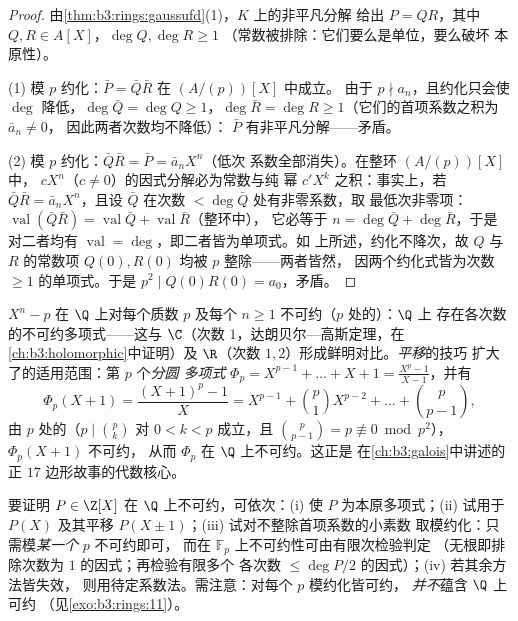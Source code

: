 \begin{proof}
由\cref{thm:b3:rings:gaussufd}(1)，$K$ 上的非平凡分解
给出 $P = QR$，其中 $Q, R \in A[X]$，$\deg Q, \deg R \geq 1$
（常数被排除：它们要么是单位，要么破坏
本原性）。

(1) 模 $p$ 约化：$\bar P = \bar Q\bar R$ 在 $(A/(p))[X]$ 中成立。
由于 $p \nmid a_n$，且约化只会使 $\deg$ 降低，$\deg \bar
Q = \deg Q \geq 1$，$\deg\bar R = \deg R \geq 1$（它们的首项系数之积为 $\bar a_n \neq 0$，
因此两者次数均不降低）：
$\bar P$ 有非平凡分解——矛盾。

(2) 模 $p$ 约化：$\bar Q \bar R = \bar P = \bar a_n X^n$（低次
系数全部消失）。在整环 $(A/(p))[X]$ 中，
$cX^n$（$c \ne 0$）的因式分解必为常数与纯
幂 $c'X^k$ 之积：事实上，若 $\bar Q\bar R = \bar a_nX^n$，且设
$\bar Q$ 在次数 $< \deg\bar Q$ 处有非零系数，取
最低次非零项：$\operatorname{val}(\bar Q\bar R) =
\operatorname{val}\bar Q + \operatorname{val}\bar R$（整环中），
它必等于 $n = \deg\bar Q + \deg\bar R$，于是
对二者均有 $\operatorname{val} = \deg$，即二者皆为单项式。如
上所述，约化不降次，故 $Q$ 与 $R$ 的常数项
$Q(0), R(0)$ 均被 $p$ 整除——两者皆然，
因两个约化式皆为次数 $\geq 1$ 的单项式。于是 $p^2 \mid
Q(0)R(0) = a_0$，矛盾。
\end{proof}

\begin{example}\label{ex:b3:rings:eisenstein}
$X^n - p$ 在 $\Q$ 上对每个质数 $p$ 及每个 $n
\geq 1$ 不可约（$p$ 处的）：$\Q$ 上
存在各次数的不可约多项式——这与 $\C$（次数
$1$，达朗贝尔—高斯定理，在\cref{ch:b3:holomorphic}中证明）及
$\R$（次数 $1, 2$）形成鲜明对比。\emph{平移}的技巧
扩大了的适用范围：第 $p$ 个\emph{分圆
多项式} $\Phi_p = X^{p-1} +
\dots + X + 1 = \frac{X^p - 1}{X - 1}$，并有
\[
\Phi_p(X + 1) = \frac{(X+1)^p - 1}{X}
= X^{p-1} + \binom{p}{1}X^{p-2} + \dots + \binom{p}{p-1},
\]
由 $p$ 处的（$p \mid \binom pk$ 对 $0 < k < p$ 成立，且
$\binom{p}{p-1} = p \not\equiv 0 \bmod p^2$），$\Phi_p(X+1)$ 不可约，
从而 $\Phi_p$ 在 $\Q$ 上不可约。这正是
在\cref{ch:b3:galois}中讲述的正 $17$ 边形故事的代数核心。
\end{example}

\begin{method}\label{met:b3:rings:irreducibility}
要证明 $P \in \Z[X]$ 在 $\Q$ 上不可约，可依次：(i) 使 $P$
为本原多项式；(ii) 试用于 $P(X)$ 及其平移 $P(X \pm
1)$；(iii) 试对不整除首项系数的小素数
取模约化：只需模\emph{某一个} $p$ 不可约即可，
而在 $\mathbb F_p$ 上不可约性可由有限次检验判定
（无根即排除次数为 $1$ 的因式；再检验有限多个
各次数 $\leq \deg P/2$ 的因式）；(iv) 若其余方法皆失效，
则用待定系数法。需注意：对每个 $p$ 模约化皆可约，
\emph{并不}蕴含 $\Q$ 上可约
（见\cref{exo:b3:rings:11}）。
\end{method}

